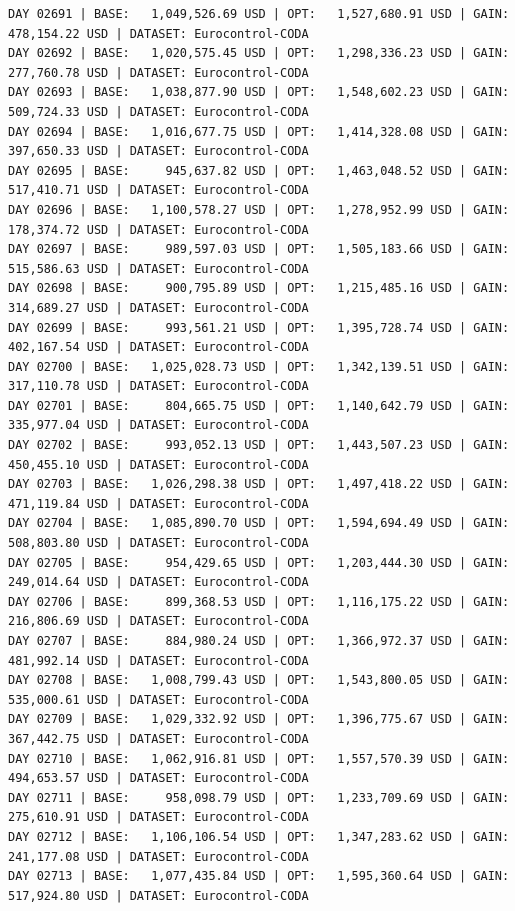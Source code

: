\documentclass[11pt,a4paper]{article}
\begin{document}
\begin{verbatim}
DAY 02691 | BASE:   1,049,526.69 USD | OPT:   1,527,680.91 USD | GAIN: 478,154.22 USD | DATASET: Eurocontrol-CODA
DAY 02692 | BASE:   1,020,575.45 USD | OPT:   1,298,336.23 USD | GAIN: 277,760.78 USD | DATASET: Eurocontrol-CODA
DAY 02693 | BASE:   1,038,877.90 USD | OPT:   1,548,602.23 USD | GAIN: 509,724.33 USD | DATASET: Eurocontrol-CODA
DAY 02694 | BASE:   1,016,677.75 USD | OPT:   1,414,328.08 USD | GAIN: 397,650.33 USD | DATASET: Eurocontrol-CODA
DAY 02695 | BASE:     945,637.82 USD | OPT:   1,463,048.52 USD | GAIN: 517,410.71 USD | DATASET: Eurocontrol-CODA
DAY 02696 | BASE:   1,100,578.27 USD | OPT:   1,278,952.99 USD | GAIN: 178,374.72 USD | DATASET: Eurocontrol-CODA
DAY 02697 | BASE:     989,597.03 USD | OPT:   1,505,183.66 USD | GAIN: 515,586.63 USD | DATASET: Eurocontrol-CODA
DAY 02698 | BASE:     900,795.89 USD | OPT:   1,215,485.16 USD | GAIN: 314,689.27 USD | DATASET: Eurocontrol-CODA
DAY 02699 | BASE:     993,561.21 USD | OPT:   1,395,728.74 USD | GAIN: 402,167.54 USD | DATASET: Eurocontrol-CODA
DAY 02700 | BASE:   1,025,028.73 USD | OPT:   1,342,139.51 USD | GAIN: 317,110.78 USD | DATASET: Eurocontrol-CODA
DAY 02701 | BASE:     804,665.75 USD | OPT:   1,140,642.79 USD | GAIN: 335,977.04 USD | DATASET: Eurocontrol-CODA
DAY 02702 | BASE:     993,052.13 USD | OPT:   1,443,507.23 USD | GAIN: 450,455.10 USD | DATASET: Eurocontrol-CODA
DAY 02703 | BASE:   1,026,298.38 USD | OPT:   1,497,418.22 USD | GAIN: 471,119.84 USD | DATASET: Eurocontrol-CODA
DAY 02704 | BASE:   1,085,890.70 USD | OPT:   1,594,694.49 USD | GAIN: 508,803.80 USD | DATASET: Eurocontrol-CODA
DAY 02705 | BASE:     954,429.65 USD | OPT:   1,203,444.30 USD | GAIN: 249,014.64 USD | DATASET: Eurocontrol-CODA
DAY 02706 | BASE:     899,368.53 USD | OPT:   1,116,175.22 USD | GAIN: 216,806.69 USD | DATASET: Eurocontrol-CODA
DAY 02707 | BASE:     884,980.24 USD | OPT:   1,366,972.37 USD | GAIN: 481,992.14 USD | DATASET: Eurocontrol-CODA
DAY 02708 | BASE:   1,008,799.43 USD | OPT:   1,543,800.05 USD | GAIN: 535,000.61 USD | DATASET: Eurocontrol-CODA
DAY 02709 | BASE:   1,029,332.92 USD | OPT:   1,396,775.67 USD | GAIN: 367,442.75 USD | DATASET: Eurocontrol-CODA
DAY 02710 | BASE:   1,062,916.81 USD | OPT:   1,557,570.39 USD | GAIN: 494,653.57 USD | DATASET: Eurocontrol-CODA
DAY 02711 | BASE:     958,098.79 USD | OPT:   1,233,709.69 USD | GAIN: 275,610.91 USD | DATASET: Eurocontrol-CODA
DAY 02712 | BASE:   1,106,106.54 USD | OPT:   1,347,283.62 USD | GAIN: 241,177.08 USD | DATASET: Eurocontrol-CODA
DAY 02713 | BASE:   1,077,435.84 USD | OPT:   1,595,360.64 USD | GAIN: 517,924.80 USD | DATASET: Eurocontrol-CODA

\end{verbatim}
\end{document}
